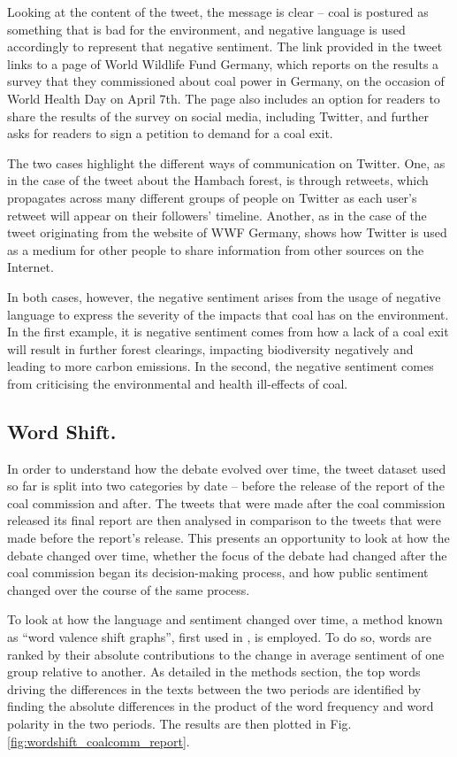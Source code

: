 \documentclass[12pt,onecolumn,twoside]{layout}
\begin{document}
Looking at the content of the tweet, the message is clear -- coal is postured as something that is bad for the environment, and negative language is used accordingly to represent that negative sentiment. The link provided in the tweet links to a page of World Wildlife Fund Germany, which reports on the results a survey that they commissioned about coal power in Germany, on the occasion of World Health Day on April 7th. The page also includes an option for readers to share the results of the survey on social media, including Twitter, and further asks for readers to sign a petition to demand for a coal exit.

The two cases highlight the different ways of communication on Twitter. One, as in the case of the tweet about the Hambach forest, is through retweets, which propagates across many different groups of people on Twitter as each user's retweet will appear on their followers' timeline. Another, as in the case of the tweet originating from the website of WWF Germany, shows how Twitter is used as a medium for other people to share information from other sources on the Internet.

In both cases, however, the negative sentiment arises from the usage of negative language to express the severity of the impacts that coal has on the environment. In the first example, it is negative sentiment comes from how a lack of a coal exit will result in further forest clearings, impacting biodiversity negatively and leading to more carbon emissions. In the second, the negative sentiment comes from criticising the environmental and health ill-effects of coal.

\subsection*{Word Shift.}
In order to understand how the debate evolved over time, the tweet dataset used so far is split into two categories by date -- before the release of the report of the coal commission and after. The tweets that were made after the coal commission released its final report are then analysed in comparison to the tweets that were made before the report's release. This presents an opportunity to look at how the debate changed over time, whether the focus of the debate had changed after the coal commission began its decision-making process, and how public sentiment changed over the course of the same process.

To look at how the language and sentiment changed over time, a method known as ``word valence shift graphs'', first used in \citep{Dodds2011}, is employed. To do so, words are ranked by their absolute contributions to the change in average sentiment of one group relative to another. As detailed in the methods section, the top words driving the differences in the texts between the two periods are identified by finding the absolute differences in the product of the word frequency and word polarity in the two periods. The results are then plotted in Fig. \ref{fig:wordshift_coalcomm_report}.
\end{document}
